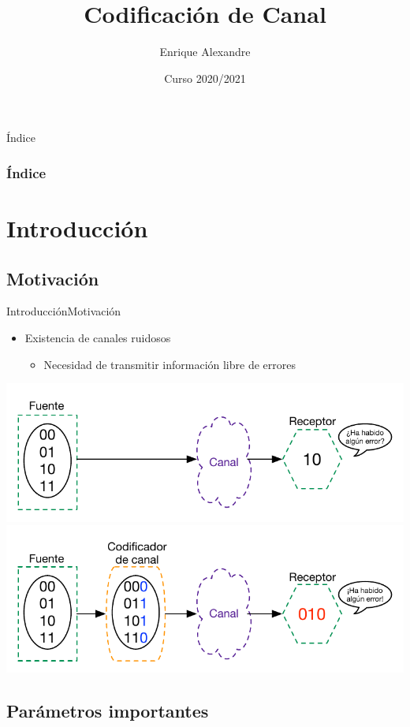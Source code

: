 \documentclass[10pt,compress]{beamer} %
\title[Codificación de Canal]{Codificación de Canal}
\author{Enrique Alexandre}
\institute{Dpto. de Teoría de la Señal y Comunicaciones}
\date{Curso 2020/2021}
\begin{document}
{\titlepageBlue
    \begin{frame}
        \titlepage
    \end{frame}
}

{
\begin{frame}[shrink]{Índice}
 \frametitle{Índice}
 \tableofcontents
\end{frame}
}

\section{Introducción}

\subsection{Motivación}

\begin{frame}{Introducción}{Motivación}
    \begin{itemize}
		\item Existencia de canales ruidosos
		\begin{itemize}
			\item Necesidad de transmitir información libre de errores
		\end{itemize}
	\end{itemize}
	\centering \includegraphics[width=0.7\linewidth]{Figuras/CodificacionDeCanal1.pdf}
	\centering \includegraphics[width=0.7\linewidth]{Figuras/CodificacionDeCanal2.pdf}
\end{frame}

\subsection{Parámetros importantes}
\end{document}
